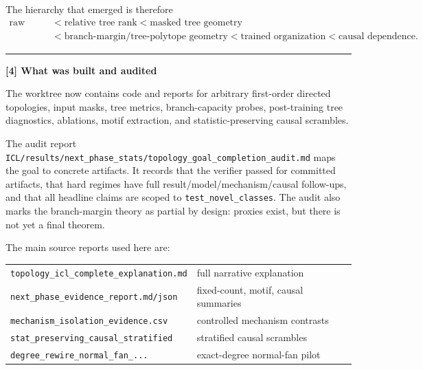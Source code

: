 \documentclass[11pt]{article}
\begin{document}
\vspace{0.5em}
\noindent The hierarchy that emerged is therefore
\[
\begin{aligned}
\text{raw count}
&<\text{relative tree rank}
<\text{masked tree geometry}\\
&<\text{branch-margin/tree-polytope geometry}
<\text{trained organization}
<\text{causal dependence}.
\end{aligned}
\]

\vspace{1em}
\noindent\rule{\textwidth}{0.4pt}
\vspace{1em}

\noindent\textbf{[4] What was built and audited}

\vspace{0.5em}
\noindent The worktree now contains code and reports for arbitrary first-order directed topologies, input masks, tree metrics, branch-capacity probes, post-training tree diagnostics, ablations, motif extraction, and statistic-preserving causal scrambles.

\vspace{0.5em}
\noindent The audit report \texttt{ICL/results/next\_phase\_stats/topology\_goal\_completion\_audit.md} maps the goal to concrete artifacts. It records that the verifier passed for committed artifacts, that hard regimes have full result/model/mechanism/causal follow-ups, and that all headline claims are scoped to \texttt{test\_novel\_classes}. The audit also marks the branch-margin theory as partial by design: proxies exist, but there is not yet a final theorem.

\vspace{0.5em}
\noindent The main source reports used here are:
\begin{center}
\small
\begin{tabular}{p{}p{}}
\texttt{topology\_icl\_complete\_explanation.md} & full narrative explanation\\
\texttt{next\_phase\_evidence\_report.md/json} & fixed-count, motif, causal summaries\\
\texttt{mechanism\_isolation\_evidence.csv} & controlled mechanism contrasts\\
\texttt{stat\_preserving\_causal\_stratified} & stratified causal scrambles\\
\texttt{degree\_rewire\_normal\_fan\_...} & exact-degree normal-fan pilot
\end{tabular}
\end{center}
\end{document}
